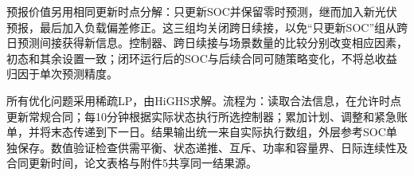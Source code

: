 预报价值另用相同更新时点分解：只更新SOC并保留零时预测，继而加入新光伏预报，最后加入负载偏差修正。这三组均关闭跨日续接，以免“只更新SOC”组从跨日预测间接获得新信息。控制器、跨日续接与场景数量的比较分别改变相应因素，初态和其余设置一致；闭环运行后的SOC与后续合同可随策略变化，不将总收益归因于单次预测精度。

所有优化问题采用稀疏LP，由HiGHS求解。流程为：读取合法信息，在允许时点更新常规合同；每10分钟根据实际状态执行所选控制器；累加计划、调整和紧急账单，并将末态传递到下一日。结果输出统一来自实际执行数组，外层参考SOC单独保存。数值验证检查供需平衡、状态递推、互斥、功率和容量界、日际连续性及合同更新时间，论文表格与附件5共享同一结果源。
